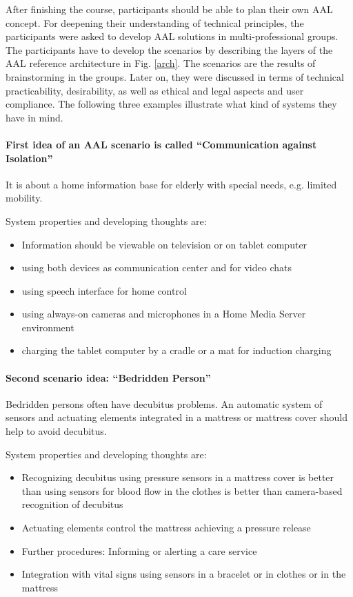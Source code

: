 \documentclass[runningheads,a4paper]{llncs}
\begin{document}
After finishing the course, participants should be able to plan their own AAL concept. For deepening their understanding of technical principles, the participants were asked to develop AAL solutions in multi-professional groups. The participants have to develop the scenarios by describing the layers of the AAL reference architecture in Fig. \ref{arch}. The scenarios are the results of brainstorming in the groups. Later on, they were discussed in terms of technical practicability, desirability, as well as ethical and legal aspects and user compliance. The following three examples illustrate what kind of systems they have in mind.

\paragraph{First idea of an AAL scenario is called ``Communication against Isolation''\\}

It is about a home information base for elderly with special needs, e.g. limited mobility.

System properties and developing thoughts are:
\begin{itemize}
\item Information should be viewable on television or on tablet computer
\item using both devices as communication center and for video chats
\item using speech interface for home control
\item using always-on cameras and microphones in a Home Media Server environment
\item charging the tablet computer by a cradle or a mat for induction charging
\end{itemize}

\paragraph{Second scenario idea: ``Bedridden Person''\\}

Bedridden persons often have decubitus problems. An automatic system of sensors and actuating elements integrated in a mattress or mattress cover should help to avoid decubitus.

System properties and developing thoughts are:
\begin{itemize}
\item Recognizing decubitus using pressure sensors in a mattress cover is better than using sensors for blood flow in the clothes is better than camera-based recognition of decubitus
\item Actuating elements control the mattress achieving a pressure release
\item Further procedures: Informing or alerting a care service
\item Integration with vital signs using sensors in a bracelet or in clothes or in the mattress
\end{itemize}
\end{document}
